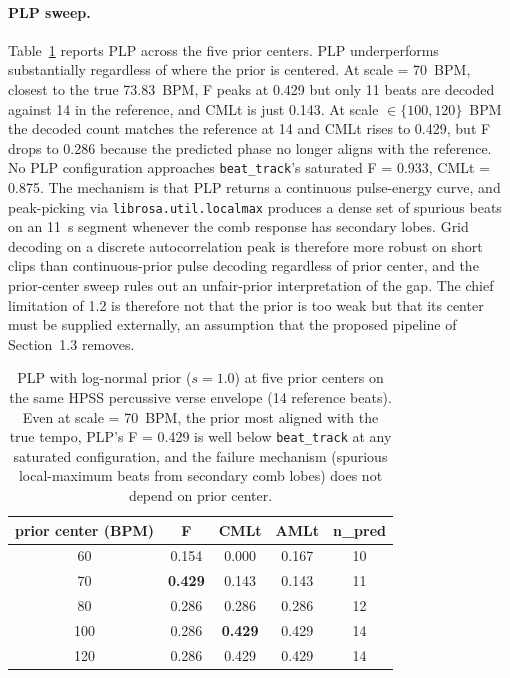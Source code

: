 \documentclass{article}
\begin{document}
\paragraph{PLP sweep.} Table~\ref{tab:plp} reports PLP across the five prior centers. PLP underperforms substantially regardless of where the prior is centered. At scale = 70~BPM, closest to the true 73.83~BPM, F peaks at 0.429 but only 11 beats are decoded against 14 in the reference, and CMLt is just 0.143. At scale $\in \{100, 120\}$~BPM the decoded count matches the reference at 14 and CMLt rises to 0.429, but F drops to 0.286 because the predicted phase no longer aligns with the reference. No PLP configuration approaches \texttt{beat\_track}'s saturated F = 0.933, CMLt = 0.875. The mechanism is that PLP returns a continuous pulse-energy curve, and peak-picking via \texttt{librosa.util.localmax} produces a dense set of spurious beats on an 11~s segment whenever the comb response has secondary lobes. Grid decoding on a discrete autocorrelation peak is therefore more robust on short clips than continuous-prior pulse decoding regardless of prior center, and the prior-center sweep rules out an unfair-prior interpretation of the gap. The chief limitation of 1.2 is therefore not that the prior is too weak but that its center must be supplied externally, an assumption that the proposed pipeline of Section~1.3 removes.

\begin{table}[ht]
    \centering
    \caption{PLP with log-normal prior ($s = 1.0$) at five prior centers on the same HPSS percussive verse envelope (14 reference beats). Even at scale = 70~BPM, the prior most aligned with the true tempo, PLP's F = 0.429 is well below \texttt{beat\_track} at any saturated configuration, and the failure mechanism (spurious local-maximum beats from secondary comb lobes) does not depend on prior center.}
    \label{tab:plp}
    \begin{tabular}{ccccc}
        \toprule
        prior center (BPM) & F     & CMLt  & AMLt  & n\_pred \\
        \midrule
        60                 & 0.154 & 0.000 & 0.167 & 10      \\
        70                 & \textbf{0.429} & 0.143 & 0.143 & 11      \\
        80                 & 0.286 & 0.286 & 0.286 & 12      \\
        100                & 0.286 & \textbf{0.429} & 0.429 & 14      \\
        120                & 0.286 & 0.429 & 0.429 & 14      \\
        \bottomrule
    \end{tabular}
\end{table}
\end{document}
